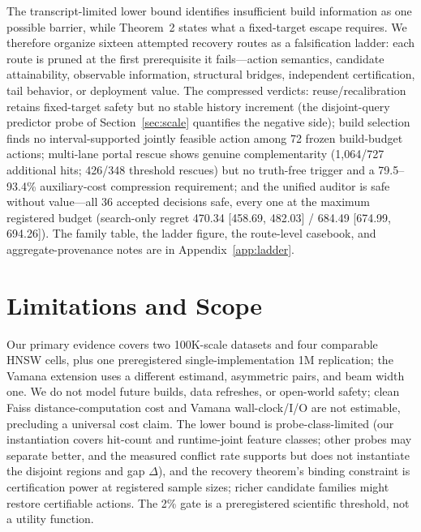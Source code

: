 \documentclass{article}
\begin{document}
The transcript-limited lower bound identifies insufficient build information as one possible barrier, while
Theorem~2 states what a fixed-target escape requires. We therefore organize sixteen attempted recovery
routes as a falsification ladder: each route is pruned at the first prerequisite it fails---action
semantics, candidate attainability, observable information, structural bridges, independent certification,
tail behavior, or deployment value. The compressed verdicts: reuse/recalibration retains fixed-target
safety but no stable history increment (the disjoint-query predictor probe of Section~\ref{sec:scale}
quantifies the negative side); build selection finds no interval-supported jointly feasible action among 72
frozen build-budget actions; multi-lane portal rescue shows genuine complementarity (1{,}064/727 additional
hits; 426/348 threshold rescues) but no truth-free trigger and a 79.5--93.4\% auxiliary-cost compression
requirement; and the unified auditor is safe without value---all 36 accepted decisions safe, every one at
the maximum registered budget (search-only regret 470.34 [458.69, 482.03] / 684.49 [674.99, 694.26]). The
family table, the ladder figure, the route-level casebook, and aggregate-provenance notes are in
Appendix~\ref{app:ladder}.

\section{Limitations and Scope}
\label{sec:limitations}

Our primary evidence covers two 100K-scale datasets and four comparable HNSW cells, plus one
preregistered single-implementation 1M replication; the Vamana extension uses a different estimand,
asymmetric pairs, and beam width one. We do not model future builds, data refreshes, or open-world safety;
clean Faiss distance-computation cost and Vamana wall-clock/I/O are not estimable, precluding a universal
cost claim. The lower bound is probe-class-limited (our instantiation covers hit-count and runtime-joint
feature classes; other probes may separate better, and the measured conflict rate supports but does not
instantiate the disjoint regions and gap $\Delta$), and the recovery theorem's binding constraint is
certification power at registered sample sizes; richer candidate families might restore certifiable
actions. The 2\% gate is a preregistered scientific threshold, not a utility function.
\end{document}
